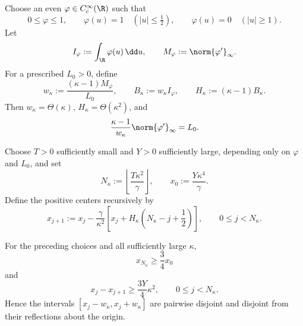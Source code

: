 Choose an even \(\varphi\in C_c^\infty(\R)\) such that
\begin{equation}
\label{app:bump:profile}
    0\leq\varphi\leq1,
    \qquad
    \varphi(u)=1\quad(|u|\leq\tfrac12),
    \qquad
    \varphi(u)=0\quad(|u|\geq1).
\end{equation}
Let
\[
    I_\varphi:=\int_\R\varphi(u)\,\dd u,
    \qquad
    M_\varphi:=\norm{\varphi'}_\infty.
\]
For a prescribed \(L_0>0\), define
\begin{equation}
\label{app:bump:width-mass}
    w_\kappa:=\frac{(\kappa-1)M_\varphi}{L_0},
    \qquad
    B_\kappa:=w_\kappa I_\varphi,
    \qquad
    H_\kappa:=(\kappa-1)B_\kappa.
\end{equation}
Then \(w_\kappa=\Theta(\kappa)\),
\(H_\kappa=\Theta(\kappa^2)\), and
\begin{equation}
\label{app:bump:lipschitz-normalization}
    \frac{\kappa-1}{w_\kappa}\norm{\varphi'}_\infty=L_0.
\end{equation}

Choose \(T>0\) sufficiently small and \(Y>0\) sufficiently large,
depending only on \(\varphi\) and \(L_0\), and set
\begin{equation}
\label{app:bump:count-initial-center}
    N_\kappa:=\left\lfloor\frac{T\kappa^2}{\gamma}\right\rfloor,
    \qquad
    x_0:=\frac{Y\kappa^4}{\gamma}.
\end{equation}
Define the positive centers recursively by
\begin{equation}
\label{app:bump:center-recursion}
    x_{j+1}
    :=x_j-\frac{\gamma}{\kappa^2}
    \left[
        x_j+H_\kappa\left(N_\kappa-j+\frac12\right)
    \right],
    \qquad 0\leq j<N_\kappa.
\end{equation}

\begin{lemma}
\label{app:bump:center-geometry}
For the preceding choices and all sufficiently large \(\kappa\),
\begin{equation}
\label{app:bump:center-lower}
    x_{N_\kappa}\geq\frac34x_0
\end{equation}
and
\begin{equation}
\label{app:bump:center-spacing}
    x_j-x_{j+1}\geq\frac{3Y}{4}\kappa^2,
    \qquad 0\leq j<N_\kappa.
\end{equation}
Hence the intervals
\([x_j-w_\kappa,x_j+w_\kappa]\) are pairwise disjoint and disjoint
from their reflections about the origin.
\end{lemma}

